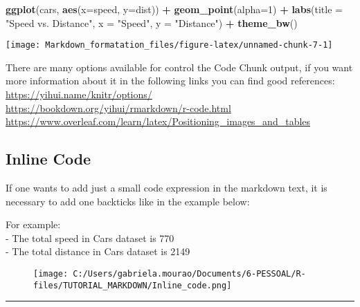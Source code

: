 \documentclass[]{article}
\newenvironment{Shaded}{\begin{snugshade}}{\end{snugshade}}
\newcommand{\KeywordTok}[1]{\textcolor[rgb]{0.13,0.29,0.53}{\textbf{#1}}}
\newcommand{\DataTypeTok}[1]{\textcolor[rgb]{0.13,0.29,0.53}{#1}}
\newcommand{\DecValTok}[1]{\textcolor[rgb]{0.00,0.00,0.81}{#1}}
\newcommand{\StringTok}[1]{\textcolor[rgb]{0.31,0.60,0.02}{#1}}
\newcommand{\OperatorTok}[1]{\textcolor[rgb]{0.81,0.36,0.00}{\textbf{#1}}}
\newcommand{\NormalTok}[1]{#1}
\begin{document}
\begin{Shaded}
\begin{Highlighting}[]
\KeywordTok{ggplot}\NormalTok{(cars, }\KeywordTok{aes}\NormalTok{(}\DataTypeTok{x=}\NormalTok{speed, }\DataTypeTok{y=}\NormalTok{dist)) }\OperatorTok{+}
\StringTok{      }\KeywordTok{geom_point}\NormalTok{(}\DataTypeTok{alpha=}\DecValTok{1}\NormalTok{) }\OperatorTok{+}\StringTok{ }
\StringTok{      }\KeywordTok{labs}\NormalTok{(}\DataTypeTok{title =} \StringTok{"Speed vs. Distance"}\NormalTok{, }\DataTypeTok{x =} \StringTok{"Speed"}\NormalTok{, }\DataTypeTok{y =} \StringTok{"Distance"}\NormalTok{) }\OperatorTok{+}\StringTok{ }
\StringTok{      }\KeywordTok{theme_bw}\NormalTok{()}
\end{Highlighting}
\end{Shaded}

\begin{center}\texttt{[image: Markdown\_formatation\_files/figure-latex/unnamed-chunk-7-1]} \end{center}

There are many options available for control the Code Chunk output, if
you want more information about it in the following links you can find
good references:\\
\url{https://yihui.name/knitr/options/}\\
\url{https://bookdown.org/yihui/rmarkdown/r-code.html}\\
\url{https://www.overleaf.com/learn/latex/Positioning_images_and_tables}

\subsection{Inline Code}\label{inline-code}

If one wants to add just a small code expression in the markdown text,
it is necessary to add one backticks like in the example below:

For example:\\
- The total speed in Cars dataset is 770\\
- The total distance in Cars dataset is 2149

\begin{figure}
\centering
\texttt{[image: C:/Users/gabriela.mourao/Documents/6-PESSOAL/R-files/TUTORIAL\_MARKDOWN/Inline\_code.png]}
\caption{}
\end{figure}

\begin{center}\rule{0.5\linewidth}{\linethickness}\end{center}
\end{document}
